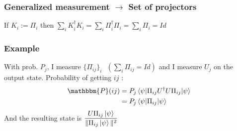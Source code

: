 \documentclass{article}
\begin{document}
\subsubsection*{Generalized measurement $\rightarrow$ Set of projectors}
If $K_i := \Pi_i$ then $\sum_i K_i^\dagger K_i = \sum_i \Pi_i^\dagger\Pi_i = \sum_i \Pi_i = Id$

\subsubsection*{Example}
With prob. $P_j$, I measure $\{\Pi_{ij}\}_i \text{ } (\sum_i \Pi_{ij} = Id)$ and I measure $U_j$ on the output state.
Probability of getting $ij$ :
\begin{equation}
    \begin{aligned}
        \mathbbm{P}(ij)
            &= P_j\braket{\psi | \Pi_{ij} U^\dagger U \Pi_{ij} | \psi} \\
            &= P_j\braket{\psi|\Pi_{ij}|\psi}
    \end{aligned}
\end{equation}
\noindent
And the resulting state is $\dfrac{U\Pi_{ij}\ket{\psi}}{\|\Pi_{ij}\ket{\psi}\|^2}$
\end{document}
